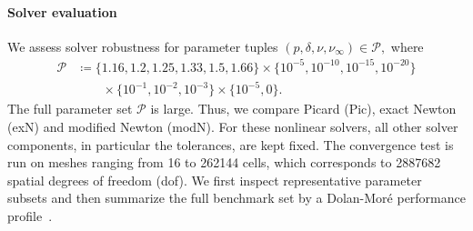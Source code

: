 \documentclass[DIV=16]{scrartcl}
\newcommand{\reg}{\delta}
\newcommand{\pn}{p}
\begin{document}
\paragraph{Solver evaluation}
\label{sec:crit-bench}
We assess solver robustness for parameter tuples
\(
  (\pn,\reg,\nu,\nu_\infty)\in\mathcal P,
\)
where
\begin{equation*}
\begin{split}
  \mathcal P
  &\coloneq
  \{1.16,1.2,1.25,1.33,1.5,1.66\}
  \times
  \{10^{-5},10^{-10},10^{-15},10^{-20}\}\\
  &\qquad\times
  \{10^{-1},10^{-2},10^{-3}\}
  \times
  \{10^{-5},0\}.
\end{split}
\end{equation*}
The full parameter set $\mathcal P$ is large. Thus, we compare Picard (Pic),
exact Newton (exN) and modified Newton (modN). For these nonlinear solvers, all other solver components, in
particular the tolerances, are kept fixed. The convergence test is run on meshes
ranging from 16 to \num[scientific-notation=false,round-precision=0]{262144}
cells, which corresponds to \num{2887682} spatial degrees of freedom (dof). We first inspect representative parameter subsets and then summarize the full benchmark set by a Dolan-Mor\'e performance profile~\cite{dolan_benchmarking_2002}.
\end{document}
